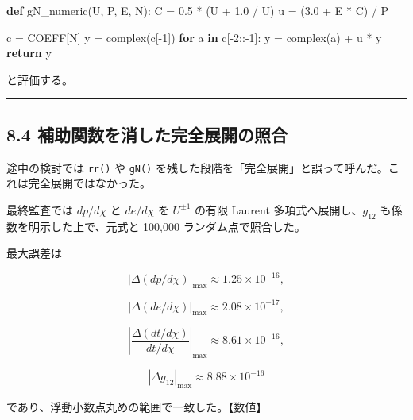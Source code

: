 \documentclass[
  a4paper,
]{ltjsarticle}
\newenvironment{Shaded}{}{}
\newcommand{\BuiltInTok}[1]{\textcolor[rgb]{0.00,0.50,0.00}{#1}}
\newcommand{\ControlFlowTok}[1]{\textcolor[rgb]{0.00,0.44,0.13}{\textbf{#1}}}
\newcommand{\DecValTok}[1]{\textcolor[rgb]{0.25,0.63,0.44}{#1}}
\newcommand{\FloatTok}[1]{\textcolor[rgb]{0.25,0.63,0.44}{#1}}
\newcommand{\KeywordTok}[1]{\textcolor[rgb]{0.00,0.44,0.13}{\textbf{#1}}}
\newcommand{\NormalTok}[1]{#1}
\newcommand{\OperatorTok}[1]{\textcolor[rgb]{0.40,0.40,0.40}{#1}}
\begin{document}
\begin{Shaded}
\begin{Highlighting}[]
\KeywordTok{def}\NormalTok{ gN\_numeric(U, P, E, N):}
\NormalTok{    C }\OperatorTok{=} \FloatTok{0.5} \OperatorTok{*}\NormalTok{ (U }\OperatorTok{+} \FloatTok{1.0} \OperatorTok{/}\NormalTok{ U)}
\NormalTok{    u }\OperatorTok{=}\NormalTok{ (}\FloatTok{3.0} \OperatorTok{+}\NormalTok{ E }\OperatorTok{*}\NormalTok{ C) }\OperatorTok{/}\NormalTok{ P}

\NormalTok{    c }\OperatorTok{=}\NormalTok{ COEFF[N]}
\NormalTok{    y }\OperatorTok{=} \BuiltInTok{complex}\NormalTok{(c[}\OperatorTok{{-}}\DecValTok{1}\NormalTok{])}
    \ControlFlowTok{for}\NormalTok{ a }\KeywordTok{in}\NormalTok{ c[}\OperatorTok{{-}}\DecValTok{2}\NormalTok{::}\OperatorTok{{-}}\DecValTok{1}\NormalTok{]:}
\NormalTok{        y }\OperatorTok{=} \BuiltInTok{complex}\NormalTok{(a) }\OperatorTok{+}\NormalTok{ u }\OperatorTok{*}\NormalTok{ y}
    \ControlFlowTok{return}\NormalTok{ y}
\end{Highlighting}
\end{Shaded}

と評価する。

\begin{center}\rule{0.5\linewidth}{0.5pt}\end{center}

\subsection{8.4
補助関数を消した完全展開の照合}\label{ux88dcux52a9ux95a2ux6570ux3092ux6d88ux3057ux305fux5b8cux5168ux5c55ux958bux306eux7167ux5408}

途中の検討では \texttt{rr()} や \texttt{gN()}
を残した段階を「完全展開」と誤って呼んだ。これは完全展開ではなかった。

最終監査では \(dp/d\chi\) と \(de/d\chi\) を \(U^{\pm1}\) の有限 Laurent
多項式へ展開し、\(g_{12}\) も係数を明示した上で、元式と 100,000
ランダム点で照合した。

最大誤差は

\[
|\Delta(dp/d\chi)|_{\max}
\approx1.25\times10^{-16},
\]

\[
|\Delta(de/d\chi)|_{\max}
\approx2.08\times10^{-17},
\]

\[
\left|\frac{\Delta(dt/d\chi)}{dt/d\chi}\right|_{\max}
\approx8.61\times10^{-16},
\]

\[
|\Delta g_{12}|_{\max}
\approx8.88\times10^{-16}
\]

であり、浮動小数点丸めの範囲で一致した。【数値】
\end{document}
